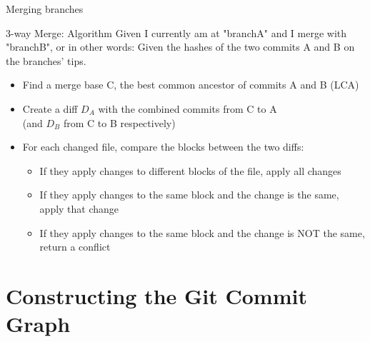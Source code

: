 \documentclass{beamer}
\begin{document}
\begin{frame}{Merging branches}
  \begin{block}{3-way Merge: Algorithm}
    Given I currently am at "branchA" and I merge with "branchB", or in other words: Given the hashes of the two commits A and B on the branches' tips.
    \begin{itemize}
      \item Find a merge base C, the best common ancestor of commits A and B (LCA)
      \item Create a diff $D_A$ with the combined commits from C to A\\(and $D_B$ from C to B respectively)
      \item For each changed file, compare the blocks between the two diffs:
      \begin{itemize}
        \item If they apply changes to different blocks of the file, apply all changes
        \item If they apply changes to the same block and the change is the same, apply that change
        \item If they apply changes to the same block and the change is NOT the same, return a conflict
      \end{itemize}
    \end{itemize}
  \end{block}
\end{frame}

\section{Constructing the Git Commit Graph}
\end{document}
